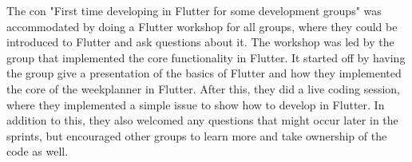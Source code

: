 The con "First time developing in Flutter for some development groups" was accommodated by doing a Flutter workshop for all groups, where they could be introduced to Flutter and ask questions about it. The workshop was led by the group that implemented the core functionality in Flutter. It started off by having the group give a presentation of the basics of Flutter and how they implemented the core of the weekplanner in Flutter. After this, they did a live coding session, where they implemented a simple issue to show how to develop in Flutter. In addition to this, they also welcomed any questions that might occur later in the sprints, but encouraged other groups to learn more and take ownership of the code as well.